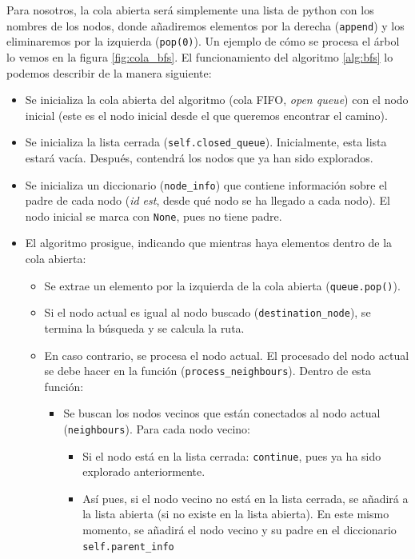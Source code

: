 \documentclass{article}
\begin{document}
Para nosotros, la cola abierta será simplemente una lista de python con los nombres de los nodos, donde añadiremos elementos por la derecha (\texttt{append}) y los eliminaremos por la izquierda (\texttt{pop(0)}). Un ejemplo de cómo se procesa el árbol lo vemos en la figura \ref{fig:cola_bfs}. El funcionamiento del algoritmo \ref{alg:bfs} lo podemos describir de la manera siguiente:
\begin{itemize}    
    \item Se inicializa la cola abierta del algoritmo (cola FIFO, \textit{open queue}) con el nodo inicial (este es el nodo inicial desde el que queremos encontrar el camino).
    \item Se inicializa la lista cerrada (\texttt{self.closed\_queue}). Inicialmente, esta lista estará vacía. Después, contendrá los nodos que ya han sido explorados.
    \item Se inicializa un diccionario (\texttt{node\_info}) que contiene información sobre el padre de cada nodo (\textit{id est}, desde qué nodo se ha llegado a cada nodo). El nodo inicial se marca con \texttt{None}, pues no tiene padre.
    \item El algoritmo prosigue, indicando que mientras haya elementos dentro de la cola abierta:
    \begin{itemize}
        \item Se extrae un elemento por la izquierda de la cola abierta (\texttt{queue.pop()}).
        \item Si el nodo actual es igual al nodo buscado (\texttt{destination\_node}), se termina la búsqueda y se calcula la ruta.
        \item En caso contrario, se procesa el nodo actual. El procesado del nodo actual se debe hacer en la función (\texttt{process\_neighbours}). Dentro de esta función:
        \begin{itemize}
            \item Se buscan los nodos vecinos que están conectados al nodo actual (\texttt{neighbours}). Para cada nodo vecino:
            \begin{itemize}
                \item Si el nodo está en la lista cerrada: \texttt{continue}, pues ya ha sido explorado anteriormente.
                \item Así pues, si el nodo vecino no está en la lista cerrada, se añadirá a la lista abierta (si no existe en la lista abierta). En este mismo momento, se añadirá el nodo vecino y su padre en el diccionario \texttt{self.parent\_info}
            \end{itemize}
        \end{itemize}
    \end{itemize}
\end{itemize}
\end{document}
